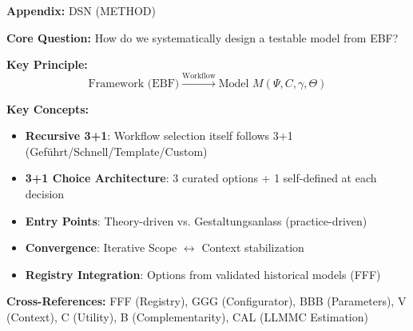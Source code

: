 \begin{tcolorbox}[colback=blue!5!white, colframe=blue!75!black,
    title=Quick Reference: Model Design Workflow]
\textbf{Appendix:} DSN (METHOD)


\textbf{Core Question:} How do we systematically design a testable model from EBF?

\textbf{Key Principle:}
\begin{equation}
\text{Framework (EBF)} \xrightarrow{\text{Workflow}} \text{Model } M(\Psi, C, \gamma, \Theta)
\end{equation}

\textbf{Key Concepts:}
\begin{itemize}[nosep]
\item \textbf{Recursive 3+1}: Workflow selection itself follows 3+1 (Geführt/Schnell/Template/Custom)
\item \textbf{3+1 Choice Architecture}: 3 curated options + 1 self-defined at each decision
\item \textbf{Entry Points}: Theory-driven vs. Gestaltungsanlass (practice-driven)
\item \textbf{Convergence}: Iterative Scope $\leftrightarrow$ Context stabilization
\item \textbf{Registry Integration}: Options from validated historical models (FFF)
\end{itemize}

\textbf{Cross-References:} FFF (Registry), GGG (Configurator), BBB (Parameters), V (Context), C (Utility), B (Complementarity), CAL (LLMMC Estimation)
\end{tcolorbox}


